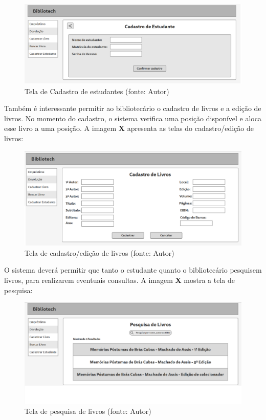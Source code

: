\begin{figure}[!h]
\centering
\includegraphics[scale=0.40, angle = 360]{figuras/prototipo3}
\caption[]{Tela de Cadastro de estudantes (fonte: Autor)}
\end{figure}
\FloatBarrier

Também é interessante permitir ao bibliotecário o cadastro de livros e a edição de livros. No momento do cadastro, o sistema verifica uma posição disponível e aloca esse livro a uma posição. A imagem \textbf{X} apresenta as telas do cadastro/edição de livros:

\begin{figure}[!h]
\centering
\includegraphics[scale=0.40, angle = 360]{figuras/prototipo4}
\caption[]{Tela de cadastro/edição de livros (fonte: Autor)}
\end{figure}
\FloatBarrier

O sistema deverá permitir que tanto o estudante quanto o bibliotecário pesquisem livros, para realizarem eventuais consultas. A imagem \textbf{X} mostra a tela de pesquisa:

\begin{figure}[!h]
\centering
\includegraphics[scale=0.40, angle = 360]{figuras/prototipo5}
\caption[]{Tela de pesquisa de livros (fonte: Autor)}
\end{figure}
\FloatBarrier

